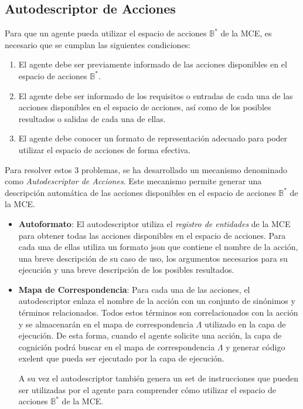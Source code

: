 \subsection{Autodescriptor de Acciones}
Para que un agente pueda utilizar el espacio de acciones \(\mathbb{B}^*\) de la 
MCE, es necesario que se cumplan las siguientes condiciones:


\begin{enumerate}
    \item El agente debe ser previamente informado de las acciones 
    disponibles en el espacio de acciones \(\mathbb{B}^*\).

    \item El agente debe ser informado de los requisitos o entradas de cada
    una de las acciones disponibles en el espacio de acciones, así como de los
    posibles resultados o salidas de cada una de ellas.

    \item El agente debe conocer un formato de representación adecuado para poder
    utilizar el espacio de acciones de forma efectiva.
\end{enumerate}

Para resolver estos 3 problemas, se ha desarrollado un mecanismo denominado como
\emph{Autodescriptor de Acciones}. Este mecanismo permite generar una descripción
automática de las acciones disponibles en el espacio de acciones \(\mathbb{B}^*\) de la MCE.


\begin{itemize}
    \item \textbf{Autoformato}: El autodescriptor utiliza el \emph{registro de entidades} de la 
    MCE para obtener todas las acciones disponibles en el espacio de acciones. Para cada una de ellas
    utiliza un formato json que contiene el nombre de la acción, una breve descripción de su caso de uso,
    los argumentos necesarios para su ejecución y una breve descripción de los posibles resultados.

    \item \textbf{Mapa de Correspondencia}: Para cada una de las acciones, el autodescriptor enlaza
    el nombre de la acción con un conjunto de sinónimos y términos relacionados. Todos estos términos
    son correlacionados con la acción y se almacenarán en el mapa de correspondencia \(\Lambda\) utilizado
    en la capa de ejecución. De esta forma, cuando el agente solicite una acción, la capa de cognición
    podrá buscar en el mapa de correspondencia \(\Lambda\) y generar código exelent que
    pueda ser ejecutado por la capa de ejecución.

    A su vez el autodescriptor también genera un set de instrucciones que
    pueden ser utilizadas por el agente para comprender cómo utilizar el espacio 
    de acciones \(\mathbb{B}^*\) de la MCE.

\end{itemize}


